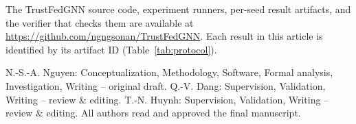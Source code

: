 \documentclass[pdflatex,sn-mathphys-num]{sn-jnl}
\newcommand{\codeurl}{\url{https://github.com/ngngsonan/TrustFedGNN}}
\begin{document}
The TrustFedGNN source code, experiment runners, per-seed result artifacts, and the verifier that checks them are available at \codeurl. Each result in this article is identified by its artifact ID (Table~\ref{tab:protocol}).

N.-S.-A. Nguyen: Conceptualization, Methodology, Software, Formal analysis, Investigation, Writing -- original draft. Q.-V. Dang: Supervision, Validation, Writing -- review \& editing. T.-N. Huynh: Supervision, Validation, Writing -- review \& editing. All authors read and approved the final manuscript.


\end{document}
